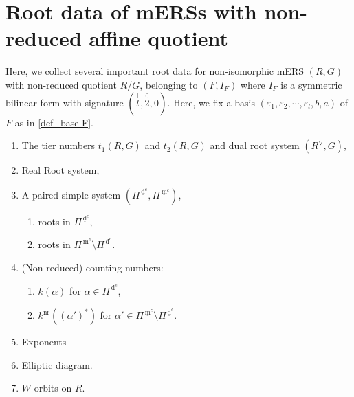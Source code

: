 \documentclass[11pt]{amsart}
\newcommand{\nr}{\mathrm{nr}}
\newcommand{\dc}{\,\underline{\mathrm{d}}^c}
\newcommand{\mc}{\, \underline{\mathrm{m}}^c}
\newcommand{\vep}{\varepsilon}
\begin{document}
{\section{Root data of mERSs with non-reduced affine quotient}\label{chapter:root-data}
Here, we collect several important root data for non-isomorphic mERS $(R,G)$ with non-reduced quotient $R/G$, belonging to 
$(F,I_F)$ where $I_F$ is a symmetric bilinear form with signature $(\overset{+}{l},\overset{0}{2},\overset{-}{0})$. 
Here, we fix a basis $(\vep_1, \vep_2,\cdots,\vep_l,b,a)$ of $F$ as in \eqref{def_base-F}.
\vskip 5mm
\begin{enumerate}
\item The tier numbers $t_1(R,G)$ and $t_2(R,G)$ and dual root system $(R^\vee,G)$,
\item Real Root system,
\item A paired simple system $(\Pi^{\dc}, \Pi^{\mc})$, 
\begin{enumerate} 
\item[i)] roots in $\Pi^{\dc}$,
\item[ii)] roots in $\Pi^{\mc} \setminus \Pi^{\dc}$.
\end{enumerate}
\item (Non-reduced) counting numbers: 
\begin{enumerate} 
\item[i)] $k(\alpha)$ for $\alpha \in \Pi^{\dc}$,
\item[ii)] $k^{\nr}((\alpha')^\ast)$ for $\alpha' \in \Pi^{\mc} \setminus \Pi^{\dc}$. 
\end{enumerate}
\item Exponents 
\item Elliptic diagram.
\item $W$-orbits on $R$.
\end{enumerate}
\vskip 0.2in 

}
\end{document}
